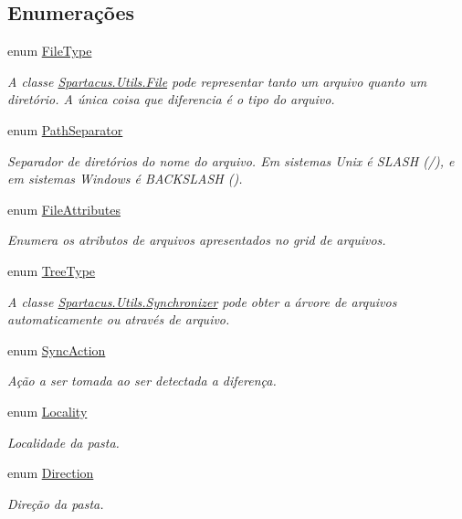 \subsection*{Enumerações}
\begin{DoxyCompactItemize}
\item 
enum \hyperlink{namespaceSpartacus_1_1Utils_a2bc44488e88db523cb2dcffaa6e77541}{File\+Type} 
\begin{DoxyCompactList}\small\item\em A classe \hyperlink{classSpartacus_1_1Utils_1_1File}{Spartacus.\+Utils.\+File} pode representar tanto um arquivo quanto um diretório. A única coisa que diferencia é o tipo do arquivo. \end{DoxyCompactList}\item 
enum \hyperlink{namespaceSpartacus_1_1Utils_a9ee24558a33d60b42674bae3eed2a094}{Path\+Separator} 
\begin{DoxyCompactList}\small\item\em Separador de diretórios do nome do arquivo. Em sistemas Unix é S\+L\+A\+S\+H (/), e em sistemas Windows é B\+A\+C\+K\+S\+L\+A\+S\+H (). \end{DoxyCompactList}\item 
enum \hyperlink{namespaceSpartacus_1_1Utils_a81ab9f259fbae2db00ea1cd29690a6cf}{File\+Attributes} 
\begin{DoxyCompactList}\small\item\em Enumera os atributos de arquivos apresentados no grid de arquivos. \end{DoxyCompactList}\item 
enum \hyperlink{namespaceSpartacus_1_1Utils_ae4b47116ae1dc35f3dc3ea735874beee}{Tree\+Type} 
\begin{DoxyCompactList}\small\item\em A classe \hyperlink{classSpartacus_1_1Utils_1_1Synchronizer}{Spartacus.\+Utils.\+Synchronizer} pode obter a árvore de arquivos automaticamente ou através de arquivo. \end{DoxyCompactList}\item 
enum \hyperlink{namespaceSpartacus_1_1Utils_a835f63b39808393d4b72d203056ae42e}{Sync\+Action} 
\begin{DoxyCompactList}\small\item\em Ação a ser tomada ao ser detectada a diferença. \end{DoxyCompactList}\item 
enum \hyperlink{namespaceSpartacus_1_1Utils_a64d6efe7b3923d4631036138e1b8b57f}{Locality} 
\begin{DoxyCompactList}\small\item\em Localidade da pasta. \end{DoxyCompactList}\item 
enum \hyperlink{namespaceSpartacus_1_1Utils_a71ccbdd8fb504defa1e9ea38771651e5}{Direction} 
\begin{DoxyCompactList}\small\item\em Direção da pasta. \end{DoxyCompactList}\end{DoxyCompactItemize}


